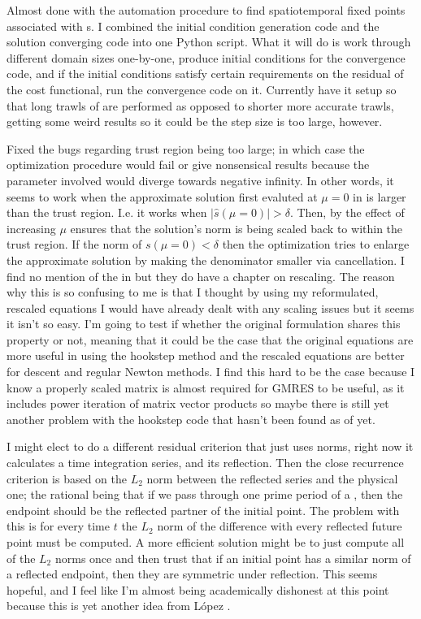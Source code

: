 Almost done with the automation procedure to find spatiotemporal fixed points associated
with \ppo s. I combined the initial condition generation code and the solution converging code
into one Python script. What it will do is work through
different domain sizes one-by-one, produce initial conditions for the convergence code, and if
the initial conditions satisfy certain requirements on the residual of the cost functional, run
the convergence code on it. Currently have it setup so that long trawls of {\statesp} are performed
as opposed to shorter more accurate trawls, getting some weird results so it could be the step size
is too large, however.

Fixed the bugs regarding trust region being too large; in which case the optimization procedure
would fail or give nonsensical results because the parameter involved would diverge towards negative
infinity. In other words, it seems to work when the approximate solution first evaluted
at $\mu = 0$ in  is larger than the trust region. I.e. it works when
$|\hat{s}(\mu = 0)| > \delta$. Then, by the effect of increasing $\mu$ ensures that the solution's norm
is being scaled back to within the trust region. If the norm of $s(\mu = 0) < \delta$ then the optimization
tries to enlarge the approximate solution by making the denominator smaller via cancellation. I find no
mention of the in  but they do have a chapter on rescaling. The reason why this is so confusing
to me is that I thought by using my reformulated, rescaled equations I would have already dealt with any scaling
issues but it seems it isn't so easy. I'm going to test if whether the original formulation shares this property
or not, meaning that it could be the case that the original equations are more useful in using the hookstep
method and the rescaled equations are better for descent and regular Newton methods. I find this hard to be
the case because I know a properly scaled matrix is almost required for GMRES to be useful, as it includes
power iteration of matrix vector products so maybe there is still yet another problem with the hookstep code
that hasn't been found as of yet.

I might elect to do a different residual criterion that just uses norms, right now it calculates
a time integration series, and its reflection. Then the close recurrence criterion is based on the
$L_2$ norm between the reflected series and the physical one; the rational being that if we pass
through one prime period of a \ppo, then the endpoint should be the reflected partner
of the initial point. The problem with this is for every time $t$ the $L_2$ norm of the difference
with every reflected future point must be computed. A more efficient solution might be to just compute
all of the $L_2$ norms once and then trust that if an initial point has a similar norm of a reflected
endpoint, then they are symmetric under reflection. This seems hopeful, and I feel like I'm almost
being academically dishonest at this point because this is yet another idea from L{\'o}pez \etal{}.


